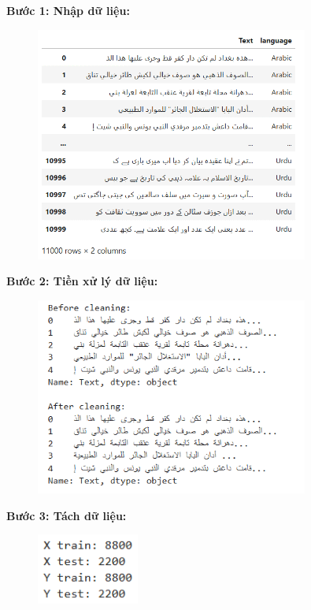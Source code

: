 \textbf{Bước 1: Nhập dữ liệu:}
\begin{figure}[H]
    \centering
    \includegraphics[width=0.8\textwidth]{img/docspics/Picture25.png}
\end{figure}
\textbf{Bước 2: Tiền xử lý dữ liệu:}
\begin{figure}[H]
    \centering
    \includegraphics[width=0.8\textwidth]{img/docspics/Picture26.png}
\end{figure}
\clearpage
\textbf{Bước 3: Tách dữ liệu:}
\begin{figure}[H]
    \centering
    \includegraphics[width=0.3\textwidth]{img/docspics/Picture27.png}
\end{figure}
